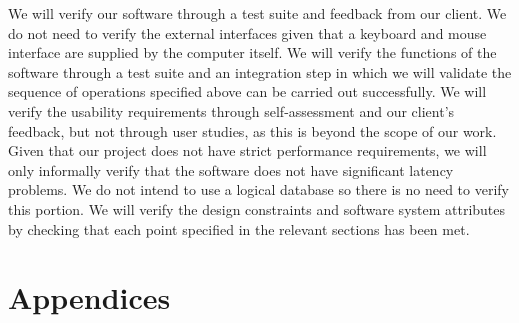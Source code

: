 \documentclass[10pt,letter,draftclsnofoot,onecolumn]{IEEEtran}
\begin{document}
\begin{singlespace}
    
    
    
    
    
    
    
    
    

    We will verify our software through a test suite and feedback from our client. We do not need to verify the external interfaces given that a keyboard and mouse interface are supplied by the computer itself. We will verify the functions of the software through a test suite and an integration step in which we will validate the sequence of operations specified above can be carried out successfully. We will verify the usability requirements through self-assessment and our client's feedback, but not through user studies, as this is beyond the scope of our work. Given that our project does not have strict performance requirements, we will only informally verify that the software does not have significant latency problems. We do not intend to use a logical database so there is no need to verify this portion. We will verify the design constraints and software system attributes by checking that each point specified in the relevant sections has been met.    
\section{Appendices}

\end{singlespace}
\end{document}
